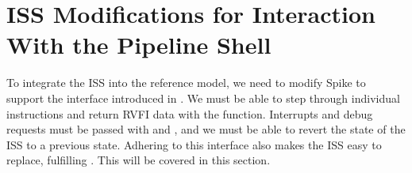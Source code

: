 

%
%
%
%
%
%


\section{ISS Modifications for Interaction With the Pipeline Shell}

To integrate the ISS into the reference model, we need to modify Spike to support the interface introduced in . We must be able to step through individual instructions and return RVFI data with the  function. Interrupts and debug requests must be passed with  and , and we must be able to revert the state of the ISS to a previous state. Adhering to this interface also makes the ISS easy to replace, fulfilling .
This will be covered in this section.

